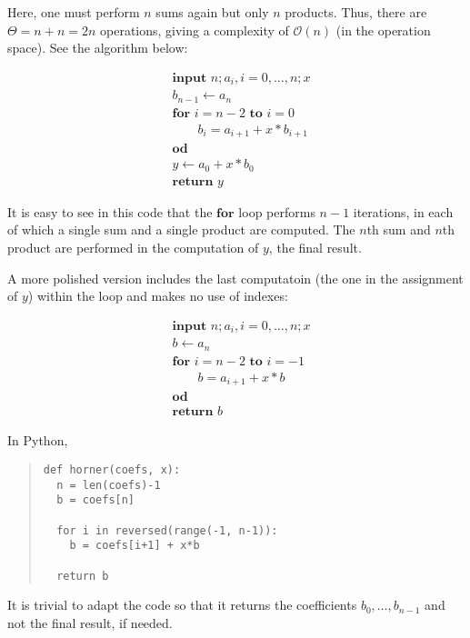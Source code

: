 \documentclass[12pt]{article}
\theoremstyle{definition}
\begin{document}
Here, one must perform $n$ sums again but only $n$ products. Thus, there are
$\Theta = n + n = 2n$ operations, giving a complexity of $\mathcal{O}(n)$ (in
the operation space). See the algorithm below:

\begin{align*}
&\textbf{input } n; a_i, i = 0, \ldots, n; x \\ 
& b_{n-1} \leftarrow a_n \\ 
& \textbf{for } i = n - 2 \textbf{ to } i = 0 \\ 
&\qquad b_{i} = a_{i+1} + x * b_{i+1} \\ 
&\textbf{od}\\
&y \leftarrow a_0 + x*b_0 \\ 
&\textbf{return } y
\end{align*}

It is easy to see in this code that the $\textbf{for}$ loop performs $n-1$
iterations, in each of which a single sum and a single product are computed. The
$n$th sum and $n$th product are performed in the computation of $y$, the final
result. 

A more polished version includes the last computatoin (the one in the assignment
of $y$) within the loop and makes no use of indexes:


\begin{align*}
&\textbf{input } n; a_i, i = 0, \ldots, n; x \\ 
& b \leftarrow a_n \\ 
& \textbf{for } i = n - 2 \textbf{ to } i = -1 \\ 
&\qquad b = a_{i+1} + x * b \\ 
&\textbf{od}\\
&\textbf{return } b
\end{align*}
 
In Python,


\small
\begin{quote}


\begin{verbatim}
def horner(coefs, x):
  n = len(coefs)-1
  b = coefs[n]

  for i in reversed(range(-1, n-1)):
    b = coefs[i+1] + x*b

  return b

\end{verbatim}

\end{quote}
\normalsize


It is trivial to adapt the code so that it returns the coefficients $b_0,
\ldots, b_{n-1}$ and not the final result, if needed.
\end{document}
